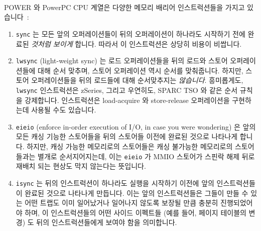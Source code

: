 POWER 와 PowerPC\textsuperscript{\textregistered} CPU 계열은 다양한 메모리
배리어 인스트럭션들을 가지고 있습니다~\cite{PowerPC94,MichaelLyons02a}:
\begin{enumerate}
\item	{\tt sync} 는 모든 앞의 오퍼레이션들이 뒤의 오퍼레이션이 하나라도
	시작하기 전에 완료된 {\em 것처럼 보이게} 합니다.
	따라서 이 인스트럭션은 상당히 비용이 비쌉니다.
\item	{\tt lwsync} (light-weight sync) 는 로드 오퍼레이션들을 뒤의 로드와
	스토어 오퍼레이션들에 대해 순서 맞추며, 스토어 오퍼레이션 역시 순서를
	맞춰줍니다.
	하지만, 스토어 오퍼레이션들을 뒤의 로드들에 대해 순서맞추지는 {\em
	않습니다}.
	흥미롭게도, {\tt lwsync} 인스트럭션은 zSeries, 그리고 우연히도, SPARC
	TSO 와 같은 순서 규칙을 강제합니다.
	 인스트럭션은 load-acquire 와 store-release 오퍼레이션을
	구현하는데 사용될 수도 있습니다.
\item	{\tt eieio} (enforce in-order execution of I/O, in case you were
	wondering) 은 앞의 모든 캐싱 기능한 스토어들을 뒤의 스토어들 이전에
	완료된 것으로 나타나게 합니다.
	하지만, 캐싱 가능한 메모리로의 스토어들은 캐싱 불가능한 메모리로의
	스토어들과는 별개로 순서지어지는데, 이는 {\tt eieio} 가 MMIO 스토어가
	스핀락 해제 뒤로 재배치 되는 현상도 막지 않는다는 뜻입니다.
\item	{\tt isync} 는 뒤의 인스트럭션이 하나라도 실행을 시작하기 이전에 앞의
	인스트럭션들이 완료된 것으로 나타나게 만듭니다.
	이는 앞의 인스트럭션들은 그들이 만들 수 있는 어떤 트랩도 이미
	일어났거나 일어나지 않도록 보장될 만큼 충분히 진행되었어야 하며, 이
	인스트럭션들의 어떤 사이드 이펙트들 (예를 들어, 페이지 테이블의 변경)
	도 뒤의 인스트럭션들에게 보여야 함을 의미합니다.
\end{enumerate}
\iffalse

